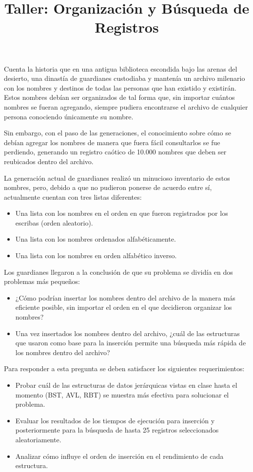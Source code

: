 \documentclass[12pt]{article}
\title{Taller: Organización y Búsqueda de Registros}
\author{}
\date{}
\begin{document}
\maketitle


Cuenta la historia que en una antigua biblioteca escondida bajo las arenas del desierto,
una dinastía de guardianes custodiaba y mantenía un archivo milenario con los nombres
y destinos de todas las personas que han existido y existirán. Estos nombres debían ser
organizados de tal forma que, sin importar cuántos nombres se fueran agregando, siempre
pudiera encontrarse el archivo de cualquier persona conociendo únicamente su nombre.

Sin embargo, con el paso de las generaciones, el conocimiento sobre cómo se debían
agregar los nombres de manera que fuera fácil consultarlos se fue perdiendo, generando un
registro caótico de 10.000 nombres que deben ser reubicados dentro del archivo.

La generación actual de guardianes realizó un minucioso inventario de estos nombres, pero,
debido a que no pudieron ponerse de acuerdo entre sí, actualmente cuentan con tres listas
diferentes:

\begin{itemize}
    \item Una lista con los nombres en el orden en que fueron registrados por los escribas (orden aleatorio).
    \item Una lista con los nombres ordenados alfabéticamente.
    \item Una lista con los nombres en orden alfabético inverso.
\end{itemize}

Los guardianes llegaron a la conclusión de que su problema se dividía en dos problemas
más pequeños:

\begin{itemize}
    \item ¿Cómo podrían insertar los nombres dentro del archivo de la manera más eficiente posible, sin importar el orden en el que decidieron organizar los nombres?
    \item Una vez insertados los nombres dentro del archivo, ¿cuál de las estructuras que usaron como base para la inserción permite una búsqueda más rápida de los nombres dentro del archivo?
\end{itemize}

Para responder a esta pregunta se deben satisfacer los siguientes requerimientos:

\begin{itemize}
    \item Probar cuál de las estructuras de datos jerárquicas vistas en clase hasta el momento (BST, AVL, RBT) se muestra más efectiva para solucionar el problema.
    \item Evaluar los resultados de los tiempos de ejecución para inserción y posteriormente para la búsqueda de hasta 25 registros seleccionados aleatoriamente.
    \item Analizar cómo influye el orden de inserción en el rendimiento de cada estructura.
\end{itemize}
\end{document}
